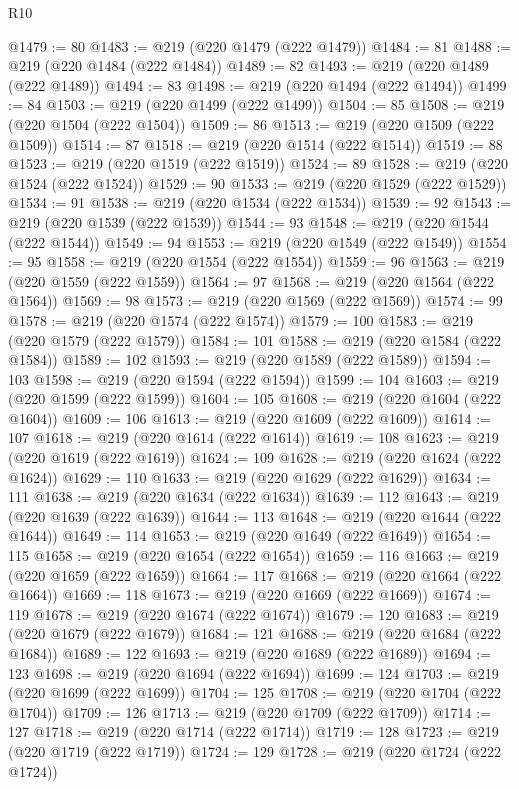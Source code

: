 \begin{lexlean}{R10}
\begin{coremodule}
@1479 := 80
@1483 := @219 (@220 @1479 (@222 @1479))
@1484 := 81
@1488 := @219 (@220 @1484 (@222 @1484))
@1489 := 82
@1493 := @219 (@220 @1489 (@222 @1489))
@1494 := 83
@1498 := @219 (@220 @1494 (@222 @1494))
@1499 := 84
@1503 := @219 (@220 @1499 (@222 @1499))
@1504 := 85
@1508 := @219 (@220 @1504 (@222 @1504))
@1509 := 86
@1513 := @219 (@220 @1509 (@222 @1509))
@1514 := 87
@1518 := @219 (@220 @1514 (@222 @1514))
@1519 := 88
@1523 := @219 (@220 @1519 (@222 @1519))
@1524 := 89
@1528 := @219 (@220 @1524 (@222 @1524))
@1529 := 90
@1533 := @219 (@220 @1529 (@222 @1529))
@1534 := 91
@1538 := @219 (@220 @1534 (@222 @1534))
@1539 := 92
@1543 := @219 (@220 @1539 (@222 @1539))
@1544 := 93
@1548 := @219 (@220 @1544 (@222 @1544))
@1549 := 94
@1553 := @219 (@220 @1549 (@222 @1549))
@1554 := 95
@1558 := @219 (@220 @1554 (@222 @1554))
@1559 := 96
@1563 := @219 (@220 @1559 (@222 @1559))
@1564 := 97
@1568 := @219 (@220 @1564 (@222 @1564))
@1569 := 98
@1573 := @219 (@220 @1569 (@222 @1569))
@1574 := 99
@1578 := @219 (@220 @1574 (@222 @1574))
@1579 := 100
@1583 := @219 (@220 @1579 (@222 @1579))
@1584 := 101
@1588 := @219 (@220 @1584 (@222 @1584))
@1589 := 102
@1593 := @219 (@220 @1589 (@222 @1589))
@1594 := 103
@1598 := @219 (@220 @1594 (@222 @1594))
@1599 := 104
@1603 := @219 (@220 @1599 (@222 @1599))
@1604 := 105
@1608 := @219 (@220 @1604 (@222 @1604))
@1609 := 106
@1613 := @219 (@220 @1609 (@222 @1609))
@1614 := 107
@1618 := @219 (@220 @1614 (@222 @1614))
@1619 := 108
@1623 := @219 (@220 @1619 (@222 @1619))
@1624 := 109
@1628 := @219 (@220 @1624 (@222 @1624))
@1629 := 110
@1633 := @219 (@220 @1629 (@222 @1629))
@1634 := 111
@1638 := @219 (@220 @1634 (@222 @1634))
@1639 := 112
@1643 := @219 (@220 @1639 (@222 @1639))
@1644 := 113
@1648 := @219 (@220 @1644 (@222 @1644))
@1649 := 114
@1653 := @219 (@220 @1649 (@222 @1649))
@1654 := 115
@1658 := @219 (@220 @1654 (@222 @1654))
@1659 := 116
@1663 := @219 (@220 @1659 (@222 @1659))
@1664 := 117
@1668 := @219 (@220 @1664 (@222 @1664))
@1669 := 118
@1673 := @219 (@220 @1669 (@222 @1669))
@1674 := 119
@1678 := @219 (@220 @1674 (@222 @1674))
@1679 := 120
@1683 := @219 (@220 @1679 (@222 @1679))
@1684 := 121
@1688 := @219 (@220 @1684 (@222 @1684))
@1689 := 122
@1693 := @219 (@220 @1689 (@222 @1689))
@1694 := 123
@1698 := @219 (@220 @1694 (@222 @1694))
@1699 := 124
@1703 := @219 (@220 @1699 (@222 @1699))
@1704 := 125
@1708 := @219 (@220 @1704 (@222 @1704))
@1709 := 126
@1713 := @219 (@220 @1709 (@222 @1709))
@1714 := 127
@1718 := @219 (@220 @1714 (@222 @1714))
@1719 := 128
@1723 := @219 (@220 @1719 (@222 @1719))
@1724 := 129
@1728 := @219 (@220 @1724 (@222 @1724))

\end{coremodule}
\end{lexlean}
